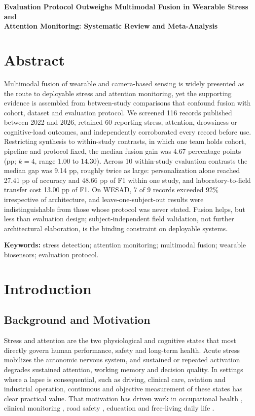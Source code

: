 \documentclass[11pt,a4paper]{article}
\begin{document}
\newpage

\setcounter{page}{1}
\begin{center}
{\large\bfseries Evaluation Protocol Outweighs Multimodal Fusion in Wearable Stress and\\[2pt]
Attention Monitoring: Systematic Review and Meta-Analysis}\\[10pt]
\end{center}

\section*{Abstract}
Multimodal fusion of wearable and camera-based sensing is widely presented as the route to
deployable stress and attention monitoring, yet the supporting evidence is assembled from
between-study comparisons that confound fusion with cohort, dataset and evaluation protocol.
We screened 116 records published between 2022 and 2026, retained 60 reporting stress,
attention, drowsiness or cognitive-load outcomes, and independently corroborated every record
before use. Restricting synthesis to within-study contrasts, in which one team holds cohort,
pipeline and protocol fixed, the median fusion gain was 4.67 percentage points (pp; $k=4$,
range 1.00 to 14.30). Across 10 within-study evaluation contrasts the median gap was 9.14 pp,
roughly twice as large: personalization alone reached 27.41 pp of accuracy and 48.66 pp of F1
within one study, and laboratory-to-field transfer cost 13.00 pp of F1. On WESAD, 7 of 9
records exceeded 92\% irrespective of architecture, and leave-one-subject-out results were
indistinguishable from those whose protocol was never stated. Fusion helps, but less than
evaluation design; subject-independent field validation, not further architectural
elaboration, is the binding constraint on deployable systems.

\textbf{Keywords:} stress detection; attention monitoring; multimodal fusion; wearable
biosensors; evaluation protocol.

\section{Introduction}

\subsection{Background and Motivation}
Stress and attention are the two physiological and cognitive states that most directly
govern human performance, safety and long-term health. Acute stress mobilizes the autonomic
nervous system, and sustained or repeated activation degrades sustained attention, working
memory and decision quality. In settings where a lapse is consequential, such as driving,
clinical care, aviation and industrial operation, continuous and objective measurement of
these states has clear practical value. That motivation has driven work in occupational
health \cite{r4,r5,r61}, clinical monitoring \cite{r3,r28,r115}, road safety \cite{r7,r8,r45},
education \cite{r30,r74,r99} and free-living daily life \cite{r10,r13,r35}.
\end{document}
